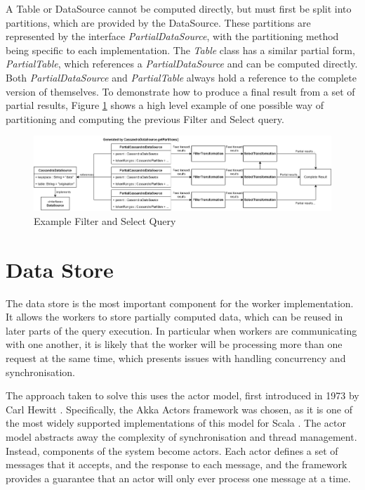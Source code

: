 A Table or DataSource cannot be computed directly, but must first be split into partitions, which are provided by the DataSource. These partitions are represented by the interface \textit{PartialDataSource}, with the partitioning method being specific to each implementation. The \textit{Table} class has a similar partial form, \textit{PartialTable}, which references a \textit{PartialDataSource} and can be computed directly. Both \textit{PartialDataSource} and \textit{PartialTable} always hold a reference to the complete version of themselves. To demonstrate how to produce a final result from a set of partial results, Figure \ref{fig:partial-filter-select-query} shows a high level example of one possible way of partitioning and computing the previous Filter and Select query.

\begin{figure}[h]
	\centering
	\includegraphics[width=\textwidth]{chapters/diagrams/implementation/partial-filter-select-query}
	\caption{Example Filter and Select Query}
	\label{fig:partial-filter-select-query}
\end{figure}



\section{Data Store}
The data store is the most important component for the worker implementation. It allows the workers to store partially computed data, which can be reused in later parts of the query execution. In particular when workers are communicating with one another, it is likely that the worker will be processing more than one request at the same time, which presents issues with handling concurrency and synchronisation.

The approach taken to solve this uses the actor model, first introduced in 1973 by Carl Hewitt \cite{hewitt1973session}. Specifically, the Akka Actors framework was chosen, as it is one of the most widely supported implementations of this model for Scala . The actor model abstracts away the complexity of synchronisation and thread management. Instead, components of the system become actors. Each actor defines a set of messages that it accepts, and the response to each message, and the framework provides a guarantee that an actor will only ever process one message at a time.

